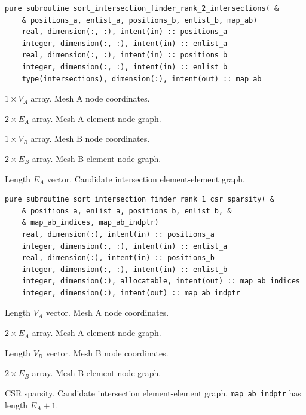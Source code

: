 \documentclass{article}
\begin{document}
\begin{lstlisting}[language=FORTRAN]
  pure subroutine sort_intersection_finder_rank_2_intersections( &
    & positions_a, enlist_a, positions_b, enlist_b, map_ab)
    real, dimension(:, :), intent(in) :: positions_a
    integer, dimension(:, :), intent(in) :: enlist_a
    real, dimension(:, :), intent(in) :: positions_b
    integer, dimension(:, :), intent(in) :: enlist_b
    type(intersections), dimension(:), intent(out) :: map_ab
\end{lstlisting}

\begin{description}[font=\ttfamily\bfseries,leftmargin=2.2\parindent,labelindent=1.7\parindent,noitemsep]
  \item[positions\_a] $1 \times V_A$ array. Mesh A node coordinates.
  \item[enlist\_a] $2 \times E_A$ array. Mesh A element-node graph.
  \item[positions\_b] $1 \times V_B$ array. Mesh B node coordinates.
  \item[enlist\_b] $2 \times E_B$ array. Mesh B element-node graph.
  \item[map\_ab] Length $E_A$ vector. Candidate intersection element-element
    graph.
\end{description}

\begin{lstlisting}[language=FORTRAN]
  pure subroutine sort_intersection_finder_rank_1_csr_sparsity( &
    & positions_a, enlist_a, positions_b, enlist_b, &
    & map_ab_indices, map_ab_indptr)
    real, dimension(:), intent(in) :: positions_a
    integer, dimension(:, :), intent(in) :: enlist_a
    real, dimension(:), intent(in) :: positions_b
    integer, dimension(:, :), intent(in) :: enlist_b
    integer, dimension(:), allocatable, intent(out) :: map_ab_indices
    integer, dimension(:), intent(out) :: map_ab_indptr
\end{lstlisting}

\begin{description}[font=\ttfamily\bfseries,leftmargin=2.2\parindent,labelindent=1.7\parindent,noitemsep]
  \item[positions\_a] Length $V_A$ vector. Mesh A node coordinates.
  \item[enlist\_a] $2 \times E_A$ array. Mesh A element-node graph.
  \item[positions\_b] Length $V_B$ vector. Mesh B node coordinates.
  \item[enlist\_b] $2 \times E_B$ array. Mesh B element-node graph.
  \item[map\_ab\_indices, map\_ab\_indptr] CSR sparsity. Candidate intersection
    element-element graph. \linebreak \verb+map_ab_indptr+ has length $E_A + 1$.
\end{description}
\end{document}

